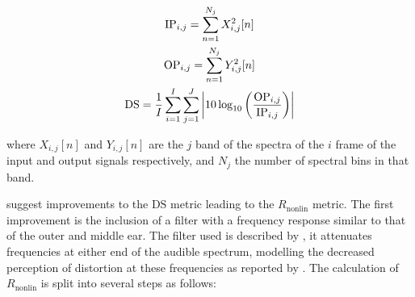 			\begin{gather}
				\mathrm{IP}_{i,j} = \sum_{n = 1}^{N_{j}} X_{i,j}^{2}[n] \nonumber \\
				\mathrm{OP}_{i,j} = \sum_{n = 1}^{N_{j}} Y_{i,j}^{2}[n] \nonumber \\
				\mathrm{DS} = \frac{1}{I} \sum_{i = 1}^{I} \sum_{j = 1}^{J} 
					\left|10\log_{10} \left( \frac{\mathrm{OP}_{i,j}}{\mathrm{IP}_{i,j}} \right) \right|
				\label{eq:DistortionScore}
			\end{gather}

			where $X_{i,j}[n]$ and $Y_{i,j}[n]$ are the $j$ band of the spectra of the $i$
			frame of the input and output signals respectively, and $N_{j}$ the number of spectral bins in that
			band.
			
			\citet{tan2004predicting} suggest improvements to the $\mathrm{DS}$ metric leading to the
			$R_{\mathrm{nonlin}}$ metric. The first improvement is the inclusion of a filter with a frequency
			response similar to that of the outer and middle ear. The filter used is described by
			\citet{glasberg2002a}, it attenuates frequencies at either end of the audible spectrum, modelling
			the decreased perception of distortion at these frequencies as reported by
			\citet{voishvillo2006assessment}. The calculation of $R_{\mathrm{nonlin}}$ is split into several
			steps as follows:
			

